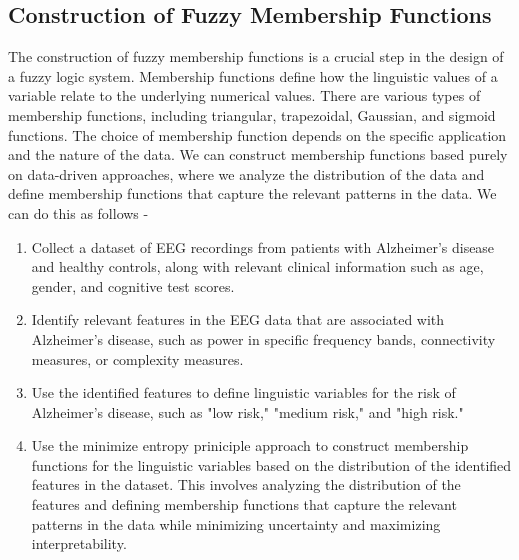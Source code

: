 \documentclass[openany]{book}
\begin{document}
\subsection{Construction of Fuzzy Membership Functions}
The construction of fuzzy membership functions is a crucial step in the design of a fuzzy logic system. Membership functions define how the linguistic values of a variable relate to the underlying numerical values. There are various types of membership functions, including triangular, trapezoidal, Gaussian, and sigmoid functions. The choice of membership function depends on the specific application and the nature of the data. We can construct membership functions based purely on data-driven approaches, where we analyze the distribution of the data and define membership functions that capture the relevant patterns in the data. We can do this as follows - \\
\begin{enumerate}
    \item Collect a dataset of EEG recordings from patients with Alzheimer's disease and healthy controls, along with relevant clinical information such as age, gender, and cognitive test scores.
    \item Identify relevant features in the EEG data that are associated with Alzheimer's disease, such as power in specific frequency bands, connectivity measures, or complexity measures. 
    \item Use the identified features to define linguistic variables for the risk of Alzheimer's disease, such as "low risk," "medium risk," and "high risk."
    \item Use the minimize entropy priniciple approach to construct membership functions for the linguistic variables based on the distribution of the identified features in the dataset. This involves analyzing the distribution of the features and defining membership functions that capture the relevant patterns in the data while minimizing uncertainty and maximizing interpretability.
\end{enumerate}
\end{document}
